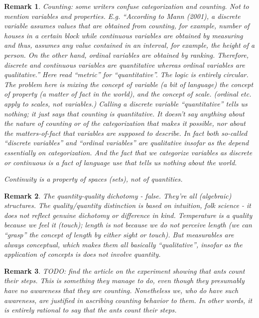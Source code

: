 \documentclass[11pt,twoside]{article}
\newtheorem{remark}{Remark}
\begin{document}
\begin{remark}
  Counting: some writers confuse categorization and counting.  Not to
  mention variables and properties.  E.g. ``According to Mann (2001),
  a discrete variable assumes values that are obtained from counting,
  for example, number of houses in a certain block while continuous
  variables are obtained by measuring and thus, assumes any value
  contained in an interval, for example, the height of a person. On
  the other hand, ordinal variables are obtained by
  ranking. Therefore, discrete and continuous variables are
  quantitative whereas ordinal variables are qualitative.''
  \cite[3-4]{yusoff_generation_2014} Here read ``metric'' for
  ``quantitative''.  The logic is entirely circular.  The problem here
  is mixing the concept of variable (a bit of language) the concept of
  property (a matter of fact in the world), and the concept of scale.
  (ordinal etc. apply to scales, not variables.)  Calling a discrete
  variable ``quantitative'' tells us nothing; it just says that
  counting is quantitative.  It doesn't say anything about the nature
  of counting or of the categorization that makes it possible, nor
  about the matters-of-fact that variables are supposed to describe.
  In fact both so-called ``discrete variables'' and ``ordinal
  variables'' are qualitative insofar as the depend essentially on
  categorization.  And the fact that we categorize variables as
  discrete or continuous is a fact of language use that tells us
  nothing about the world.

  Continuity is a property of spaces (sets), not of quantities.
\end{remark}

\begin{remark}
  The quantity-quality dichotomy - false.  They're all (algebraic)
  structures.  The quality/quantity distinction is based on intuition,
  folk science - it does not reflect genuine dichotomy or difference
  in kind.  Temperature is a quality because we feel it (touch);
  length is not because we do not perceive length (we can ``grasp''
  the concept of length by either sight or touch).  But measurables
  are always conceptual, which makes them all basically
  ``qualitative'', insofar as the application of concepts is does not
  involve quantity.
\end{remark}

\begin{remark}
  TODO: find the article on the experiment showing that ants count
  their steps.  This is something they manage to do, even though they
  presumably have no awareness \textit{that} they are counting.
  Nonetheless \textit{we}, who do have such awareness, are justified
  in ascribing counting behavior to them.  In other words, it is
  entirely rational to say \textit{that} the ants count their steps.
\end{remark}
\end{document}
